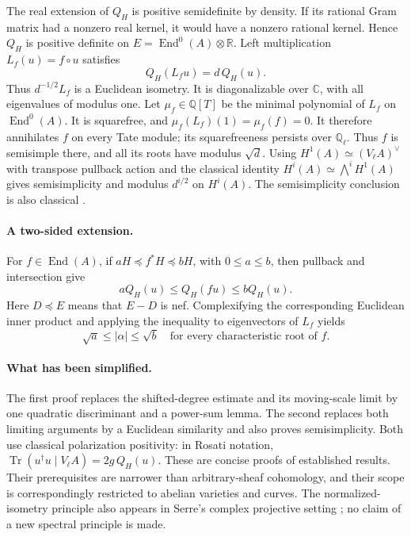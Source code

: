\documentclass[11pt]{article}
\newcommand{\End}{\operatorname{End}}
\newcommand{\Tr}{\operatorname{Tr}}
\newcommand{\Q}{\mathbb Q}
\newcommand{\R}{\mathbb R}
\newcommand{\C}{\mathbb C}
\begin{document}
The real extension of \(Q_H\) is positive semidefinite by density.
If its rational Gram matrix had a nonzero real kernel, it would have
a nonzero rational kernel. Hence \(Q_H\) is positive definite on
\(E=\End^0(A)\otimes\R\).
Left multiplication \(L_f(u)=f\circ u\) satisfies
\[
 Q_H(L_fu)=d\,Q_H(u).
 \tag{4}
\]
Thus \(d^{-1/2}L_f\) is a Euclidean isometry. It is diagonalizable over
\(\C\), with all eigenvalues of modulus one.
Let \(\mu_f\in\Q[T]\) be the minimal polynomial of \(L_f\) on
\(\End^0(A)\). It is squarefree, and
\(\mu_f(L_f)(1)=\mu_f(f)=0\). It therefore annihilates \(f\) on every
Tate module; its squarefreeness persists over \(\Q_\ell\).
Thus \(f\) is semisimple there, and all its roots have modulus \(\sqrt d\).
Using \(H^1(A)\simeq(V_\ell A)^\vee\) with transpose pullback action and
the classical identity \(H^i(A)\simeq\bigwedge^iH^1(A)\) gives
semisimplicity and modulus \(d^{i/2}\) on \(H^i(A)\).
The semisimplicity conclusion is also classical \cite[II, Lemma 1.3]{MilneAV}.

\paragraph{A two-sided extension.}
For \(f\in\End(A)\), if \(aH\preceq f^*H\preceq bH\), with \(0\le a\le b\),
then pullback and intersection give
\[
 aQ_H(u)\le Q_H(fu)\le bQ_H(u).
\]
Here \(D\preceq E\) means that \(E-D\) is nef.
Complexifying the corresponding Euclidean inner product and applying the
inequality to eigenvectors of \(L_f\) yields
\[
 \sqrt a\le|\alpha|\le\sqrt b
 \quad\text{for every characteristic root of }f.
 \tag{5}
\]

\paragraph{What has been simplified.}
The first proof replaces the shifted-degree estimate and its moving-scale
limit by one quadratic discriminant and a power-sum lemma.
The second replaces both limiting arguments by a Euclidean similarity and
also proves semisimplicity. Both use classical polarization positivity:
in Rosati notation, \(\Tr(u^\dagger u\mid V_\ell A)=2g\,Q_H(u)\).
These are concise proofs of established results. Their prerequisites are
narrower than arbitrary-sheaf cohomology, and their scope is correspondingly
restricted to abelian varieties and curves.
The normalized-isometry principle also appears in Serre's complex
projective setting \cite{Serre}; no claim of a new spectral principle is made.
\end{document}
